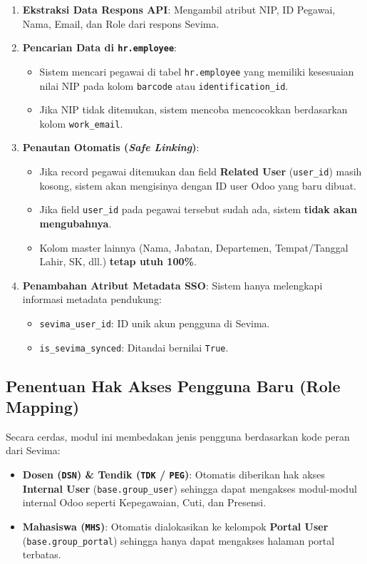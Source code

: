 \documentclass[11pt,a4paper]{article}
\begin{document}
\begin{enumerate}
    \item \textbf{Ekstraksi Data Respons API}: Mengambil atribut NIP, ID Pegawai, Nama, Email, dan Role dari respons Sevima.
    \item \textbf{Pencarian Data di \texttt{hr.employee}}:
    \begin{itemize}
        \item Sistem mencari pegawai di tabel \texttt{hr.employee} yang memiliki kesesuaian nilai NIP pada kolom \texttt{barcode} atau \texttt{identification\_id}.
        \item Jika NIP tidak ditemukan, sistem mencoba mencocokkan berdasarkan kolom \texttt{work\_email}.
    \end{itemize}
    \item \textbf{Penautan Otomatis (\textit{Safe Linking})}:
    \begin{itemize}
        \item Jika record pegawai ditemukan dan field \textbf{Related User} (\texttt{user\_id}) masih kosong, sistem akan mengisinya dengan ID user Odoo yang baru dibuat.
        \item Jika field \texttt{user\_id} pada pegawai tersebut sudah ada, sistem \textbf{tidak akan mengubahnya}.
        \item Kolom master lainnya (Nama, Jabatan, Departemen, Tempat/Tanggal Lahir, SK, dll.) \textbf{tetap utuh 100\%}.
    \end{itemize}
    \item \textbf{Penambahan Atribut Metadata SSO}:
    Sistem hanya melengkapi informasi metadata pendukung:
    \begin{itemize}
        \item \texttt{sevima\_user\_id}: ID unik akun pengguna di Sevima.
        \item \texttt{is\_sevima\_synced}: Ditandai bernilai \texttt{True}.
    \end{itemize}
\end{enumerate}

\subsection{Penentuan Hak Akses Pengguna Baru (Role Mapping)}
Secara cerdas, modul ini membedakan jenis pengguna berdasarkan kode peran dari Sevima:
\begin{itemize}
    \item \textbf{Dosen (\texttt{DSN}) \& Tendik (\texttt{TDK} / \texttt{PEG})}:
    Otomatis diberikan hak akses \textbf{Internal User} (\texttt{base.group\_user}) sehingga dapat mengakses modul-modul internal Odoo seperti Kepegawaian, Cuti, dan Presensi.
    \item \textbf{Mahasiswa (\texttt{MHS})}:
    Otomatis dialokasikan ke kelompok \textbf{Portal User} (\texttt{base.group\_portal}) sehingga hanya dapat mengakses halaman portal terbatas.
\end{itemize}
\end{document}

